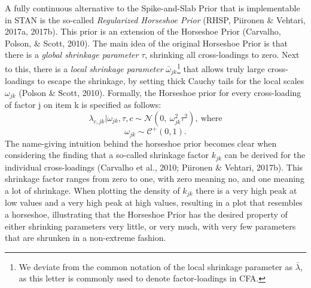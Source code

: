 \documentclass[
  man, donotrepeattitle,floatsintext]{apa6}
\begin{document}
A fully continuous alternative to the Spike-and-Slab Prior that is implementable in STAN is the so-called \emph{Regularized Horseshoe Prior} (RHSP, Piironen \& Vehtari, 2017a, 2017b). This prior is an extension of the Horseshoe Prior (Carvalho, Polson, \& Scott, 2010). The main idea of the original Horseshoe Prior is that there is a \emph{global shrinkage parameter} \(\tau\), shrinking all cross-loadings to zero. Next to this, there is a \emph{local shrinkage parameter} \(\bar{\omega}_{jk}\)\footnote{We deviate from the common notation of the local shrinkage parameter as \(\bar{\lambda}\), as this letter is commonly used to denote factor-loadings in CFA.} that allows truly large cross-loadings to escape the shrinkage, by setting thick Cauchy tails for the local scales \(\omega_{jk}\) (Polson \& Scott, 2010). Formally, the Horseshoe prior for every cross-loading of factor j on item k is specified as follows:
\[\lambda_{c,jk} | \omega_{jk}, \tau, c\sim \mathcal{N}(0, \ \omega^2_{jk} \tau^2), \ \text{where}\]
\[\omega_{jk} \sim \mathcal{C^+}(0, 1).\]
The name-giving intuition behind the horseshoe prior becomes clear when considering the finding that a so-called shrinkage factor \(k_{jk}\) can be derived for the individual cross-loadings (Carvalho et al., 2010; Piironen \& Vehtari, 2017b). This shrinkage factor ranges from zero to one, with zero meaning no, and one meaning a lot of shrinkage. When plotting the density of \(k_{jk}\) there is a very high peak at low values and a very high peak at high values, resulting in a plot that resembles a horseshoe, illustrating that the Horseshoe Prior has the desired property of either shrinking parameters very little, or very much, with very few parameters that are shrunken in a non-extreme fashion.
\end{document}
